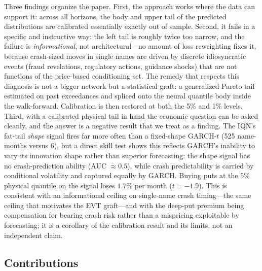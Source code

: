 \documentclass[11pt]{article}
\begin{document}
Three findings organize the paper. First, the approach works where the data can support it: across all horizons, the body and upper tail of the predicted distributions are calibrated essentially exactly out of sample. Second, it fails in a specific and instructive way: the left tail is roughly twice too narrow, and the failure is \emph{informational}, not architectural---no amount of loss reweighting fixes it, because crash-sized moves in single names are driven by discrete idiosyncratic events (fraud revelations, regulatory actions, guidance shocks) that are not functions of the price-based conditioning set. The remedy that respects this diagnosis is not a bigger network but a statistical graft: a generalized Pareto tail \citep{balkema1974, pickands1975, mcneilfrey2000} estimated on past exceedances and spliced onto the neural quantile body inside the walk-forward. Calibration is then restored at both the 5\% and 1\% levels. Third, with a calibrated physical tail in hand the economic question can be asked cleanly, and the answer is a negative result that we treat as a finding. The IQN's fat-tail \emph{shape} signal fires far more often than a fixed-shape GARCH-$t$ (525 name-months versus 6), but a direct skill test shows this reflects GARCH's inability to vary its innovation shape rather than superior forecasting: the shape signal has no crash-prediction ability (AUC $\approx 0.5$), while crash predictability is carried by conditional volatility and captured equally by GARCH. Buying puts at the $5\%$ physical quantile on the signal loses $1.7\%$ per month ($t=-1.9$). This is consistent with an informational ceiling on single-name crash timing---the same ceiling that motivates the EVT graft---and with the deep-put premium being compensation for bearing crash risk rather than a mispricing exploitable by forecasting; it is a corollary of the calibration result and its limits, not an independent claim.

\subsection{Contributions}\label{sec:contributions}
\end{document}
